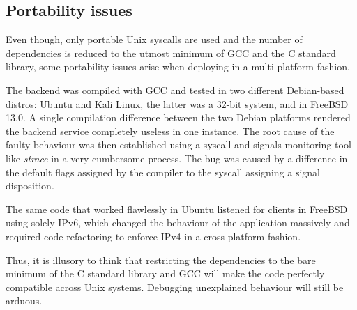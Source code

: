 \subsection{Portability issues}
Even though, only portable Unix syscalls are used and the number of dependencies is reduced to the utmost minimum of GCC and the C standard library, some portability issues arise when deploying in a multi-platform fashion.

The backend was compiled with GCC and tested in two different Debian-based distros: Ubuntu and Kali Linux, the latter was a 32-bit system, and in FreeBSD 13.0. A single compilation difference between the two Debian platforms rendered the backend service completely useless in one instance. The root cause of the faulty behaviour was then established using a syscall and signals monitoring tool like \textit{strace} in a very cumbersome process. The bug was caused by a difference in the default flags assigned by the compiler to the syscall assigning a signal disposition.

The same code that worked flawlessly in Ubuntu listened for clients in FreeBSD using solely IPv6, which changed the behaviour of the application massively and required code refactoring to enforce IPv4 in a cross-platform fashion.

Thus, it is illusory to think that restricting the dependencies to the bare minimum of the C standard library and GCC will make the code perfectly compatible across Unix systems. Debugging unexplained behaviour will still be arduous.